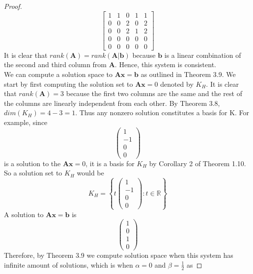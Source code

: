 \documentclass[11pt]{scrartcl}
\begin{document}
\begin{enumerate}[label=\alph*.]
{\begin{proof}
		      \[
			      \left [ \begin{array}{cccc|c}
					      1 & 1 & 0 & 1 & 1 \\
					      0 & 0 & 2 & 0 & 2 \\
					      0 & 0 & 2 & 1 & 2 \\
					      0 & 0 & 0 & 0 & 0 \\
					      0 & 0 & 0 & 0 & 0
				      \end{array} \right ]
		      \]
		      It is clear that  $rank(\mathbf{A}) = rank(\mathbf{A}|\mathbf{b})$ because
		      $\mathbf{b}$ is a linear combination of the second and third column from
		      $\mathbf{A}$. Hence, this system is consistent. \\
		      We can compute a solution space to $\mathbf{Ax=b}$ as outlined in Theorem 3.9. We start by first computing the
		      solution set to $\mathbf{Ax}=0$ denoted by $K_H$. It is clear that $rank(\mathbf{A}) = 3$ because the first two
		      columns are the same and the rest of the columns are linearly independent from each other.
		      By Theorem 3.8, $dim(K_H) = 4 - 3 = 1$. Thus any nonzero solution constitutes a basis for K. For example, since
		      $$
			      \begin{pmatrix}
				      1  \\
				      -1 \\
				      0  \\
				      0
			      \end{pmatrix}
		      $$
		      is a solution to the $\mathbf{Ax}=0$, it is a basis for $K_H$ by Corollary 2 of Theorem 1.10.
		      So a solution set to $K_H$ would be
		      \[
			      K_H=
			      \left\{
			      t\begin{pmatrix}
				      1  \\
				      -1 \\
				      0  \\
				      0
			      \end{pmatrix}: t \in \mathbb{R}
			      \right\}
		      \]
		      A solution to $\mathbf{Ax=b}$ is
		      $$
			      \begin{pmatrix}
				      1 \\
				      0 \\
				      1 \\
				      0
			      \end{pmatrix}
		      $$
		      Therefore, by Theorem 3.9 we compute solution space when this system has infinite amount of solutions, which is when $\alpha = 0$ and $\beta = \frac12$ as

\end{proof}}
\end{enumerate}
\end{document}
